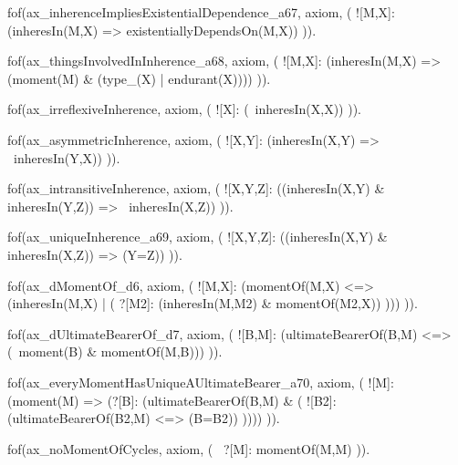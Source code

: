 




fof(ax_inherenceImpliesExistentialDependence_a67, axiom, (
  ![M,X]: (inheresIn(M,X) => existentiallyDependsOn(M,X))
)).

fof(ax_thingsInvolvedInInherence_a68, axiom, (
  ![M,X]: (inheresIn(M,X) => (moment(M) & (type_(X) | endurant(X))))
)).


fof(ax_irreflexiveInherence, axiom, (
  ![X]: (~inheresIn(X,X))
)).

fof(ax_asymmetricInherence, axiom, (
  ![X,Y]: (inheresIn(X,Y) => ~inheresIn(Y,X))
)).

fof(ax_intransitiveInherence, axiom, (
  ![X,Y,Z]: ((inheresIn(X,Y) & inheresIn(Y,Z)) => ~inheresIn(X,Z))
)).

fof(ax_uniqueInherence_a69, axiom, (
  ![X,Y,Z]: ((inheresIn(X,Y) & inheresIn(X,Z)) => (Y=Z))
)).


fof(ax_dMomentOf_d6, axiom, (
  ![M,X]: (momentOf(M,X) <=> (inheresIn(M,X) | (
    ?[M2]: (inheresIn(M,M2) & momentOf(M2,X))
  )))
)).

fof(ax_dUltimateBearerOf_d7, axiom, (
  ![B,M]: (ultimateBearerOf(B,M) <=> (~moment(B) & momentOf(M,B)))
)).

fof(ax_everyMomentHasUniqueAUltimateBearer_a70, axiom, (
  ![M]: (moment(M) => (?[B]: (ultimateBearerOf(B,M) & (
    ![B2]: (ultimateBearerOf(B2,M) <=> (B=B2))
  ))))
)).

fof(ax_noMomentOfCycles, axiom, (
  ~?[M]: momentOf(M,M)
)).




